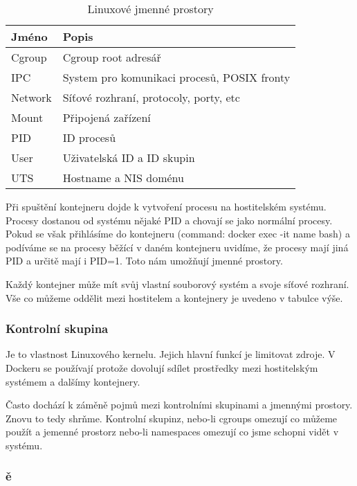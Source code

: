 \documentclass[thesis=B,czech]{FITthesis}[2019/12/23]
\begin{document}
\begin{table}[h!]
  \begin{center}
    \caption{Linuxové jmenné prostory}
    \label{tab:table1}
    \begin{tabular}{l|l} 
      \textbf{Jméno} & \textbf{Popis} \\
      \hline

	  Cgroup  &  Cgroup root adresář\\
	  IPC     &  System pro komunikaci procesů, POSIX fronty\\
	  Network &  Síťové rozhraní, protocoly, porty, etc\\
      Mount   &  Připojená zařízení\\
      PID     &  ID procesů\\
      User    &  Uživatelská ID a ID skupin\\
      UTS     &  Hostname a NIS doménu\\   
      
    \end{tabular}
  \end{center}
\end{table}

Při spuštění kontejneru dojde k vytvoření procesu na hostitelském systému. Procesy dostanou od systému nějaké PID a chovají se jako normální procesy. Pokud se však přihlásíme do kontejneru (command: docker exec -it name bash) a podíváme se na procesy běžící v daném kontejneru uvidíme, že procesy mají jiná PID a určitě mají i PID=1. Toto nám umožňují jmenné prostory.

Každý kontejner může mít svůj vlastní souborový systém a svoje síťové rozhraní. Vše co můžeme oddělit mezi hostitelem a kontejnery je uvedeno v tabulce výše. 

\subsubsection{Kontrolní skupina}

Je to vlastnost Linuxového kernelu. Jejich hlavní funkcí je limitovat zdroje. V Dockeru se používají protože dovolují sdílet prostředky mezi hostitelským systémem a dalšímy kontejnery. 

Často dochází k záměně pojmů mezi kontrolními skupinami a jmennými prostory. Znovu to tedy shrňme. Kontrolní skupinz, nebo-li cgroups omezují co můžeme použít a jemenné prostorz nebo-li namespaces omezují co jsme schopni vidět v systému. 

\subsubsection{ě}
\end{document}
